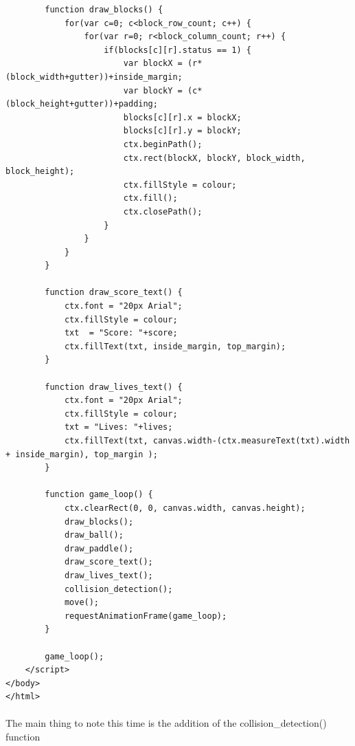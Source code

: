 \documentclass[10pt, a4paper, oneside]{article}
\begin{document}
\begin{lstlisting}
        function draw_blocks() {
            for(var c=0; c<block_row_count; c++) {
                for(var r=0; r<block_column_count; r++) {
                    if(blocks[c][r].status == 1) {
                        var blockX = (r*(block_width+gutter))+inside_margin;
                        var blockY = (c*(block_height+gutter))+padding;
                        blocks[c][r].x = blockX;
                        blocks[c][r].y = blockY;
                        ctx.beginPath();
                        ctx.rect(blockX, blockY, block_width, block_height);
                        ctx.fillStyle = colour;
                        ctx.fill();
                        ctx.closePath();
                    }
                }
            }
        }

        function draw_score_text() {
            ctx.font = "20px Arial";
            ctx.fillStyle = colour;
            txt  = "Score: "+score;
            ctx.fillText(txt, inside_margin, top_margin);
        }

        function draw_lives_text() {
            ctx.font = "20px Arial";
            ctx.fillStyle = colour;
            txt = "Lives: "+lives;
            ctx.fillText(txt, canvas.width-(ctx.measureText(txt).width + inside_margin), top_margin );
        }

        function game_loop() {
            ctx.clearRect(0, 0, canvas.width, canvas.height);
            draw_blocks();
            draw_ball();
            draw_paddle();
            draw_score_text();
            draw_lives_text();
            collision_detection();
            move();
            requestAnimationFrame(game_loop);
        }
        
        game_loop();
    </script>
</body>
</html>
\end{lstlisting}

\paragraph{} The main thing to note this time is the addition of the collision\_detection() function
\end{document}
